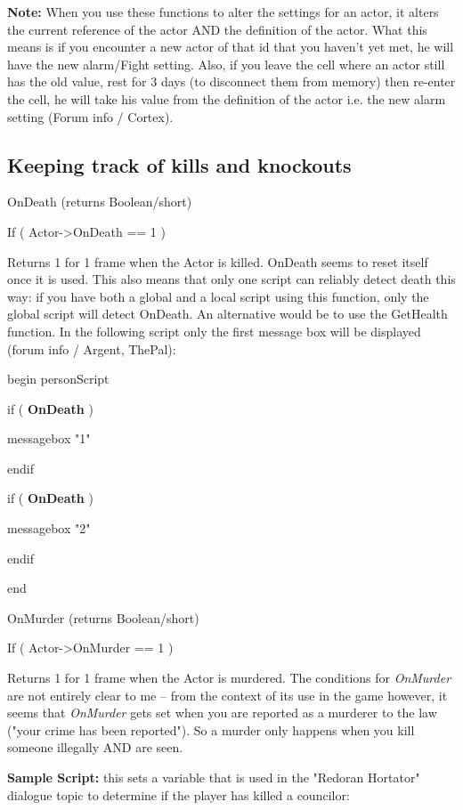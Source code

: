 \documentclass[
]{article}
\begin{document}
\textbf{Note:} When you use these functions to alter the settings for an
actor, it alters the current reference of the actor AND the definition
of the actor. What this means is if you encounter a new actor of that id
that you haven't yet met, he will have the new alarm/Fight setting.
Also, if you leave the cell where an actor still has the old value, rest
for 3 days (to disconnect them from memory) then re-enter the cell, he
will take his value from the definition of the actor i.e. the new alarm
setting (Forum info / Cortex).

\hypertarget{keeping-track-of-kills-and-knockouts}{%
\subsection{Keeping track of kills and
knockouts}\label{keeping-track-of-kills-and-knockouts}}

OnDeath (returns Boolean/short)

If ( Actor-\textgreater OnDeath == 1 )

Returns 1 for 1 frame when the Actor is killed. OnDeath seems to reset
itself once it is used. This also means that only one script can
reliably detect death this way: if you have both a global and a local
script using this function, only the global script will detect OnDeath.
An alternative would be to use the GetHealth function. In the following
script only the first message box will be displayed (forum info /
Argent, ThePal):

begin personScript

if ( \textbf{OnDeath} )

messagebox "1"

endif

if ( \textbf{OnDeath} )

messagebox "2"

endif

end

OnMurder (returns Boolean/short)

If ( Actor-\textgreater OnMurder == 1 )

Returns 1 for 1 frame when the Actor is murdered. The conditions for
\emph{OnMurder} are not entirely clear to me -- from the context of its
use in the game however, it seems that \emph{OnMurder} gets set when you
are reported as a murderer to the law ("your crime has been reported").
So a murder only happens when you kill someone illegally AND are seen.

\textbf{Sample Script:} this sets a variable that is used in the
"Redoran Hortator" dialogue topic to determine if the player has killed
a councilor:
\end{document}
